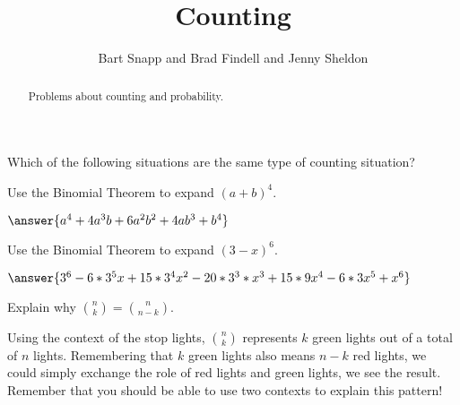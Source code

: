 \documentclass[nooutcomes]{ximera}
\title{Counting}
\author{Bart Snapp and Brad Findell and Jenny Sheldon}
\begin{document}
\begin{abstract}
Problems about counting and probability.
\end{abstract}
\maketitle




\begin{problem}
	Which of the following situations are the same type of counting situation?
	
	\begin{selectAll}
	\end{selectAll}
\end{problem}


\begin{problem}
Use the Binomial Theorem to expand $(a+b)^4$.
\begin{prompt}
 $\answer{a^4+4a^3b+6a^2b^2+4ab^3+b^4}$
\end{prompt}
\end{problem}


\begin{problem}
Use the Binomial Theorem to expand $(3-x)^6$.
\begin{prompt}
 $\answer{3^6-6*3^5x+15*3^4x^2-20*3^3*x^3+15*9x^4-6*3x^5+x^6}$
\end{prompt}
\end{problem}


\begin{problem}
Explain why ${n \choose k} = {n \choose n-k}$.
\begin{freeResponse}
	\begin{hint}
		Using the context of the stop lights, ${n \choose k}$ represents $k$ green lights out of a total of $n$ lights.  Remembering that $k$ green lights also means $n-k$ red lights, we could simply exchange the role of red lights and green lights, we see the result.  Remember that you should be able to use two contexts to explain this pattern!
	\end{hint}
\end{freeResponse}
\end{problem}
\end{document}
